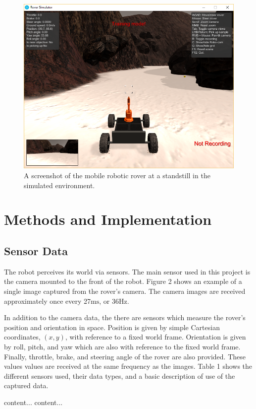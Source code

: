 \documentclass[a4paper]{article}
\begin{document}
\begin{figure}
\centering
\includegraphics{image_1}
\caption{A screenshot of the mobile robotic rover at a standstill in the simulated environment.}
\end{figure}

\section{Methods and Implementation}
\subsection{Sensor Data}
The robot perceives its world via sensors. The main sensor used in this project is the camera mounted to the front of the robot. Figure 2 shows an example of a single image captured from the rover's camera. The camera images are received approximately once every 27$\si{\milli\second}$, or 36$\si{\hertz}$.

In addition to the camera data, the there are sensors which measure the rover's position and orientation in space. Position is given by simple Cartesian coordinates, $(x, y)$, with reference to a fixed world frame. Orientation is given by roll, pitch, and yaw which are also with reference to the fixed world frame. Finally, throttle, brake, and steering angle of the rover are also provided. These values values are received at the same frequency as the images. Table 1 shows the different sensors used, their data types, and a basic description of use of the captured data. 

\begin{table}
\caption{A table which shows the different data types, their python format, and the frequency at which they are sampled from the simulated environment}
\begin{tabular}{content...}
content...
\end{tabular}
\end{table}
\end{document}
